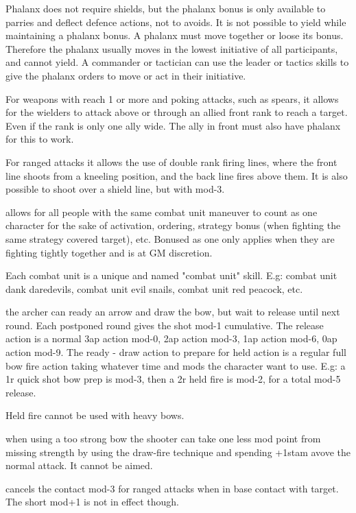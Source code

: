 Phalanx does not require shields, but the phalanx bonus is only available to parries and deflect defence actions, not to avoids.
It is not possible to yield while maintaining a phalanx bonus. A phalanx must move together or loose its bonus. Therefore the phalanx usually moves in the lowest initiative of all participants, and cannot yield. A commander or tactician can use the leader or tactics skills to give the phalanx orders to move or act in their initiative.

For weapons with reach 1 or more and poking attacks, such as spears, it allows for the wielders to attack above or through an allied front rank to reach a target. Even if the rank is only one ally wide. The ally in front must also have phalanx for this to work.

For ranged attacks it allows the use of double rank firing lines, where the front line shoots from a kneeling position, and the back line fires above them. It is also possible to shoot over a shield line, but with mod-3.


 allows for all people with the same combat unit maneuver to count as one character for the sake of activation, ordering, strategy bonus (when fighting the same strategy covered target), etc. Bonused as one only applies when they are fighting tightly together and is at GM discretion.

Each combat unit is a unique and named "combat unit" skill. E.g: combat unit dank daredevils, combat unit evil snails, combat unit red peacock, etc.


 the archer can ready an arrow and draw the bow, but wait to release until next round. Each postponed round gives the shot mod-1 cumulative. The release action is a normal 3ap action mod-0, 2ap action mod-3, 1ap action mod-6, 0ap action mod-9.
The ready - draw action to prepare for held action is a regular full bow fire action taking whatever time and mods the character want to use.
E.g: a 1r quick shot bow prep is mod-3, then a 2r held fire is mod-2, for a total mod-5 release.

Held fire cannot be used with heavy bows.


 when using a too strong bow the shooter can take one less mod point from missing strength by using the draw-fire technique and spending +1stam avove the normal attack. It cannot be aimed.


 cancels the contact mod-3 for ranged attacks when in base contact with target. The short mod+1 is not in effect though.



